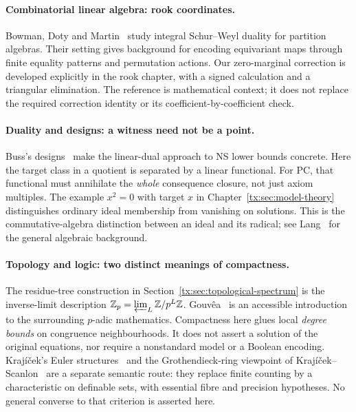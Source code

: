 \documentclass[11pt,a4paper,oneside,openany]{book}
\theoremstyle{definition}\newtheorem{definition}[theorem]{Definition}
\theoremstyle{remark}\newtheorem{remark}[theorem]{Remark}
\numberwithin{equation}{chapter}
\begin{document}
\paragraph{Combinatorial linear algebra: rook coordinates.}
Bowman, Doty and Martin~\cite{BDM} study integral Schur--Weyl duality
for partition algebras. Their setting gives background for encoding
equivariant maps through finite equality patterns and permutation
actions. Our zero-marginal correction is developed explicitly in the
rook chapter, with a signed calculation and a triangular elimination.
The reference is mathematical context; it does not replace the
required correction identity or its coefficient-by-coefficient check.

\paragraph{Duality and designs: a witness need not be a point.}
Buss's designs~\cite{BussDesign} make the linear-dual approach to NS
lower bounds concrete. Here the target class in a quotient is separated
by a linear functional. For PC, that functional must annihilate the
\emph{whole} consequence closure, not just axiom multiples. The example
$x^2=0$ with target $x$ in Chapter~\ref{tx:sec:model-theory} distinguishes
ordinary ideal membership from vanishing on solutions. This is the
commutative-algebra distinction between an ideal and its radical;
see Lang~\cite{LangAlgebra} for the general algebraic background.

\paragraph{Topology and logic: two distinct meanings of compactness.}
The residue-tree construction in Section~\ref{tx:sec:topological-spectrum}
is the inverse-limit description
$\mathbb Z_p=\varprojlim_L\mathbb Z/p^L\mathbb Z$.
Gouv\^ea~\cite{Gouvea} is an accessible introduction to the surrounding
$p$-adic mathematics. Compactness here glues local \emph{degree bounds}
on congruence neighbourhoods. It does not assert a solution of the
original equations, nor require a nonstandard model or a Boolean
encoding. Kraj\'i\v cek's Euler structures~\cite{KrajEuler} and the
Grothendieck-ring viewpoint of Kraj\'i\v cek--Scanlon~\cite{KrajScanlon}
are a separate semantic route: they replace finite counting by a
characteristic on definable sets, with essential fibre and precision
hypotheses. No general converse to that criterion is asserted here.
\end{document}
